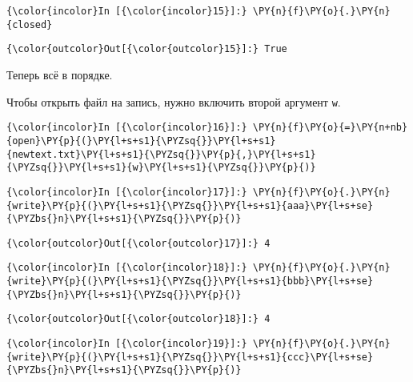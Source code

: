     \begin{Verbatim}[commandchars=\\\{\}]
{\color{incolor}In [{\color{incolor}15}]:} \PY{n}{f}\PY{o}{.}\PY{n}{closed}
\end{Verbatim}

            \begin{Verbatim}[commandchars=\\\{\}]
{\color{outcolor}Out[{\color{outcolor}15}]:} True
\end{Verbatim}
        
    Теперь всё в порядке.

Чтобы открыть файл на запись, нужно включить второй аргумент
\texttt{\textquotesingle{}w\textquotesingle{}}.

    \begin{Verbatim}[commandchars=\\\{\}]
{\color{incolor}In [{\color{incolor}16}]:} \PY{n}{f}\PY{o}{=}\PY{n+nb}{open}\PY{p}{(}\PY{l+s+s1}{\PYZsq{}}\PY{l+s+s1}{newtext.txt}\PY{l+s+s1}{\PYZsq{}}\PY{p}{,}\PY{l+s+s1}{\PYZsq{}}\PY{l+s+s1}{w}\PY{l+s+s1}{\PYZsq{}}\PY{p}{)}
\end{Verbatim}

    \begin{Verbatim}[commandchars=\\\{\}]
{\color{incolor}In [{\color{incolor}17}]:} \PY{n}{f}\PY{o}{.}\PY{n}{write}\PY{p}{(}\PY{l+s+s1}{\PYZsq{}}\PY{l+s+s1}{aaa}\PY{l+s+se}{\PYZbs{}n}\PY{l+s+s1}{\PYZsq{}}\PY{p}{)}
\end{Verbatim}

            \begin{Verbatim}[commandchars=\\\{\}]
{\color{outcolor}Out[{\color{outcolor}17}]:} 4
\end{Verbatim}
        
    \begin{Verbatim}[commandchars=\\\{\}]
{\color{incolor}In [{\color{incolor}18}]:} \PY{n}{f}\PY{o}{.}\PY{n}{write}\PY{p}{(}\PY{l+s+s1}{\PYZsq{}}\PY{l+s+s1}{bbb}\PY{l+s+se}{\PYZbs{}n}\PY{l+s+s1}{\PYZsq{}}\PY{p}{)}
\end{Verbatim}

            \begin{Verbatim}[commandchars=\\\{\}]
{\color{outcolor}Out[{\color{outcolor}18}]:} 4
\end{Verbatim}
        
    \begin{Verbatim}[commandchars=\\\{\}]
{\color{incolor}In [{\color{incolor}19}]:} \PY{n}{f}\PY{o}{.}\PY{n}{write}\PY{p}{(}\PY{l+s+s1}{\PYZsq{}}\PY{l+s+s1}{ccc}\PY{l+s+se}{\PYZbs{}n}\PY{l+s+s1}{\PYZsq{}}\PY{p}{)}
\end{Verbatim}

